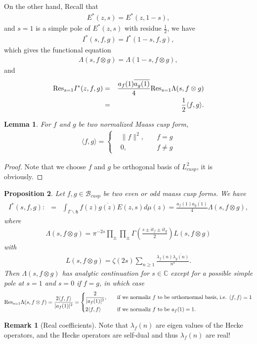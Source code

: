 \documentclass[11pt,reqno]{amsart}
\newcommand{\bna}{\begin{eqnarray*}}
\newcommand{\ena}{\end{eqnarray*}}
\newcommand{\mk}{\mathfrak}
\def\res{{\rm Res}}
\def\C{\mathbb{C}}
\newtheorem{lemma}{Lemma}[section]
\newtheorem{prop}[lemma]{Proposition}
\theoremstyle{definition}
\newtheorem{remark}{Remark}
\begin{document}
On the other hand, Recall that
\bna
E^*(z,s)=E^*(z,1-s),
\ena
and $s=1$ is a simple pole of $E^*(z,s)$ with residue $\frac{1}{2}$,
 we have
\bna
I^*(s,f,g)=I^*(1-s,f,g),
\ena
which gives the functional equation
\bna
\Lambda(s,f\otimes g)=\Lambda(1-s,f\otimes g),
\ena
 and
\bna
\res_{s=1}I^*(z,f,g)&=&\frac{a_f(1)\overline{a_g(1)}}{4}\res_{s=1}\Lambda(s,f\otimes g)\\
&=&\frac{1}{2}\langle f,g\rangle.
\ena
\begin{lemma}For $f$ and $g$ be two normalized Maass cusp form,
\bna
\langle f,g\rangle =\left\{
\begin{aligned}
&\|f\|^2,\quad &f=g\\
&0,\quad &f\neq g
\end{aligned}
\right.
\ena
\end{lemma}
\begin{proof}Note that we choose $f$ and $g$ be orthogonal basis of $L^2_{cusp}$,
it is obviously.
\end{proof}

\begin{prop}
Let $f,g\in\mathcal B_{cusp}$ be two even or odd maass cusp forms.
 We have
\bna
I^*(s,f,g):&=&\int_{\Gamma\backslash\mk h}f(z)\overline{g(z)}E(z,s)d\mu(z)
=\frac{a_f(1)\overline{a_g(1)}}{4}\Lambda(s,f\otimes g),
\ena
where
\bna
\Lambda(s,f\otimes g)=\pi^{-2s}\prod_{\pm}\prod_{\pm}\Gamma\left(\frac{s\pm it_f\pm it_g}{2}\right)
L(s,f\otimes g)
\ena
with
\bna
L(s,f\otimes g)=\zeta(2s)\sum_{n\geq 1}\frac{\lambda_f(n)\overline{\lambda_g(n)}}{n^s}.
\ena
Then $\Lambda (s,f\otimes g)$ has analytic continuation for $s\in\C$ except for a possible simple pole at $s=1$
and $s=0$ if $f=g$, in which case
\bna
\res_{s=1}\Lambda(s,f\otimes f)=\frac{2\langle f,f\rangle }{|a_f(1)|^2}
=\left\{
\begin{aligned}
&\frac{2}{|a_f(1)|^2},\quad &&\mbox{if we normaliz $f$ to be orthornormal basis, i.e. $\langle f,f\rangle=1$}\\
&2\langle f,f\rangle
\quad &&\mbox{if we normaliz $f$ to be $a_f(1)=1$.}
\end{aligned}
\right.
\ena

\end{prop}
\begin{remark}[Real coefficients]
Note that $\lambda_f(n)$ are eigen values of the Hecke operators, and the Hecke operators
 are self-dual and thus $\lambda_f(n)$ are real!
\end{remark}
\end{document}
